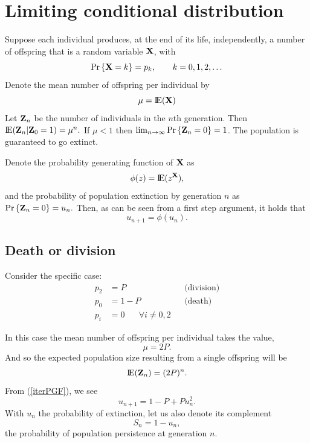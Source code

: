 



\section{Limiting conditional distribution}



Suppose each individual produces, at the end of its life, independently, a number of offspring that is a random variable ${\bf X}$, with 
$${\text{Pr}\left\{{\bf X} = k\right\}} = p_k, \hspace{20pt} k = 0,1,2,\dots$$
Denote the mean number of offspring per individual by 
$$\mu={\rm I}\!{\rm E}({\bf X})$$
Let ${\bf Z}_n$ be the number of individuals in the $n$th generation. Then ${\rm I}\!{\rm E}({\bf Z}_n|{\bf Z}_0=1) = \mu^n.$ If $\mu < 1$ then $\lim_{n\to \infty}{{\text{Pr}\left\{{\bf Z}_n = 0\right\}}} = 1$. The population is guaranteed to go extinct.

Denote the probability generating function of ${\bf X}$ as 
$$\phi(z) = {\rm I}\!{\rm E}(z^{{\bf X}}),$$
and the probability of population extinction by generation $n$ as 
${\text{Pr}\left\{{\bf Z}_n = 0\right\}} = u_n.$
Then, as can be seen from a first step argument, it holds that 
\begin{equation}
\label{iterPGF}
u_{n+1} = \phi(u_n).
\end{equation}

\subsection{Death or division}
Consider the specific case: 
\begin{align*}
p_2 &= P &&\text{(division)}  \\
p_0 &= 1-P && \text{(death)}\\
p_i &= 0 \hspace{20pt} \forall i \neq 0,2  
\end{align*}

\noindent
In this case the mean number of offspring per individual takes the value,
$$\mu = 2P.$$
And so the expected population size resulting from a single offspring will be
$${\rm I}\!{\rm E}({\bf Z}_n) = (2P)^n.$$
From (\ref{iterPGF}), we see
\begin{equation}
\label{unIter}
u_{n+1} = 1-P + P u_n^2.
\end{equation}
With $u_n$ the probability of extinction, let us also denote its complement
$$S_n = 1-u_n,$$
the probability of population persistence at generation $n$. 

